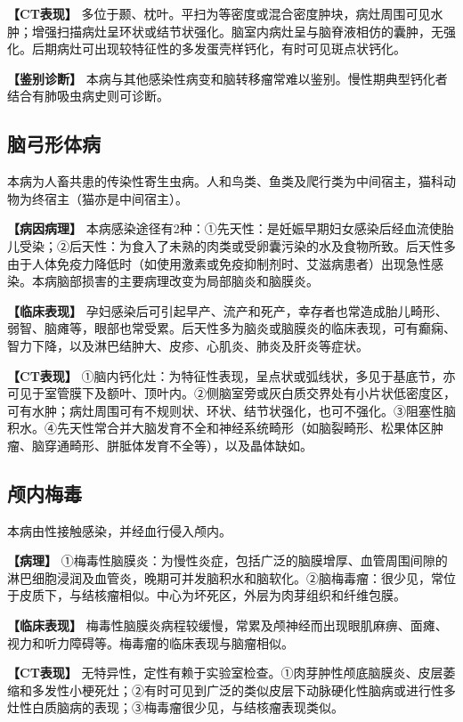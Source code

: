 \textbf{【CT表现】}
多位于颞、枕叶。平扫为等密度或混合密度肿块，病灶周围可见水肿；增强扫描病灶呈环状或结节状强化。脑室内病灶呈与脑脊液相仿的囊肿，无强化。后期病灶可出现较特征性的多发蛋壳样钙化，有时可见斑点状钙化。

\textbf{【鉴别诊断】}
本病与其他感染性病变和脑转移瘤常难以鉴别。慢性期典型钙化者结合有肺吸虫病史则可诊断。

\subsection{脑弓形体病}

本病为人畜共患的传染性寄生虫病。人和鸟类、鱼类及爬行类为中间宿主，猫科动物为终宿主（猫亦是中间宿主）。

\textbf{【病因病理】}
本病感染途径有2种：①先天性：是妊娠早期妇女感染后经血流使胎儿受染；②后天性：为食入了未熟的肉类或受卵囊污染的水及食物所致。后天性多由于人体免疫力降低时（如使用激素或免疫抑制剂时、艾滋病患者）出现急性感染。本病脑部损害的主要病理改变为局部脑炎和脑膜炎。

\textbf{【临床表现】}
孕妇感染后可引起早产、流产和死产，幸存者也常造成胎儿畸形、弱智、脑瘫等，眼部也常受累。后天性多为脑炎或脑膜炎的临床表现，可有癫痫、智力下降，以及淋巴结肿大、皮疹、心肌炎、肺炎及肝炎等症状。

\textbf{【CT表现】}
①脑内钙化灶：为特征性表现，呈点状或弧线状，多见于基底节，亦可见于室管膜下及额叶、顶叶内。②侧脑室旁或灰白质交界处有小片状低密度区，可有水肿；病灶周围可有不规则状、环状、结节状强化，也可不强化。③阻塞性脑积水。④先天性常合并大脑发育不全和神经系统畸形（如脑裂畸形、松果体区肿瘤、脑穿通畸形、胼胝体发育不全等），以及晶体缺如。

\subsection{颅内梅毒}

本病由性接触感染，并经血行侵入颅内。

\textbf{【病理】}
①梅毒性脑膜炎：为慢性炎症，包括广泛的脑膜增厚、血管周围间隙的淋巴细胞浸润及血管炎，晚期可并发脑积水和脑软化。②脑梅毒瘤：很少见，常位于皮质下，与结核瘤相似。中心为坏死区，外层为肉芽组织和纤维包膜。

\textbf{【临床表现】}
梅毒性脑膜炎病程较缓慢，常累及颅神经而出现眼肌麻痹、面瘫、视力和听力障碍等。梅毒瘤的临床表现与脑瘤相似。

\textbf{【CT表现】}
无特异性，定性有赖于实验室检查。①肉芽肿性颅底脑膜炎、皮层萎缩和多发性小梗死灶；②有时可见到广泛的类似皮层下动脉硬化性脑病或进行性多灶性白质脑病的表现；③梅毒瘤很少见，与结核瘤表现类似。

